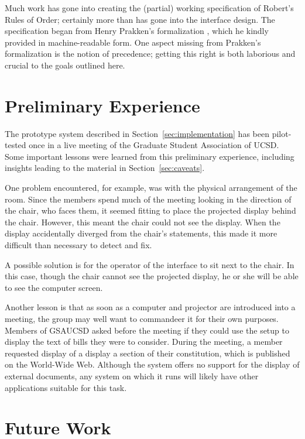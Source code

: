 \documentclass{acm_proc_article-sp}
\begin{document}
Much work has gone into creating the (partial) working specification of Robert's Rules of Order; certainly more than has gone into the interface design. The specification began from Henry Prakken's formalization \cite{prakken:formalizing}, which he kindly provided in machine-readable form. One aspect missing from Prakken's formalization is the notion of precedence; getting this right is both laborious and crucial to the goals outlined here.
 
\section{Preliminary Experience}  %


The prototype system described in Section~\ref{sec:implementation} has been pilot-tested once in a live meeting of the Graduate Student Association of UCSD. Some important lessons were learned from this preliminary experience, including insights leading to the material in Section~\ref{sec:caveats}.

One problem encountered, for example, was with the physical arrangement of the room. Since the members spend much of the meeting looking in the direction of the chair, who faces them, it seemed fitting to place the projected display behind the chair. However, this meant the chair could not see the display. When the display accidentally diverged from the chair's statements, this made it more difficult than necessary to detect and fix.

A possible solution is for the operator of the interface to sit next to the chair. In this case, though the chair cannot see the projected display, he or she will be able to see the computer screen. 

Another lesson is that as soon as a computer and projector are introduced into a meeting, the group may well want to commandeer it for their own purposes. Members of GSAUCSD asked before the meeting if they could use the setup to display the text of bills they were to consider. During the meeting, a member requested display of a display a section of their constitution, which is published on the World-Wide Web. Although the system offers no support for the display of external documents, any system on which it runs will likely have other applications suitable for this task.

\section{Future Work}  %
\end{document}
